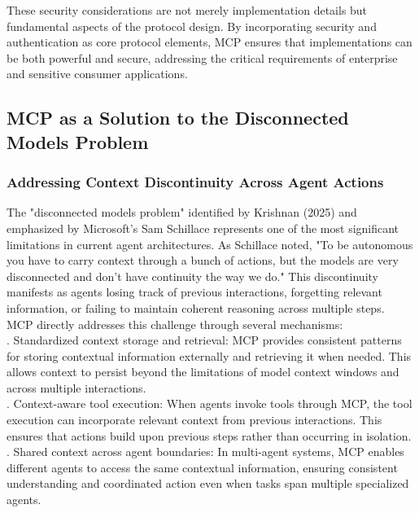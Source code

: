These security considerations are not merely implementation details but fundamental aspects of the protocol design. By incorporating security and authentication as core protocol elements, MCP ensures that implementations can be both powerful and secure, addressing the critical requirements of enterprise and sensitive consumer applications.\\
\subsection{MCP as a Solution to the Disconnected Models Problem}
\subsubsection{Addressing Context Discontinuity Across Agent Actions}
The "disconnected models problem" identified by Krishnan (2025) and emphasized by Microsoft's Sam Schillace represents one of the most significant limitations in current agent architectures. As Schillace noted, "To be autonomous you have to carry context through a bunch of actions, but the models are very disconnected and don't have continuity the way we do." This discontinuity manifests as agents losing track of previous interactions, forgetting relevant information, or failing to maintain coherent reasoning across multiple steps.\\ \newline
MCP directly addresses this challenge through several mechanisms:\\ . Standardized context storage and retrieval: MCP provides consistent patterns for storing contextual information externally and retrieving it when needed. This allows context to persist beyond the limitations of model context windows and across multiple interactions.\\ . Context-aware tool execution: When agents invoke tools through MCP, the tool execution can incorporate relevant context from previous interactions. This ensures that actions build upon previous steps rather than occurring in isolation.\\ . Shared context across agent boundaries: In multi-agent systems, MCP enables different agents to access the same contextual information, ensuring consistent understanding and coordinated action even when tasks span multiple specialized agents.\\ \newline
